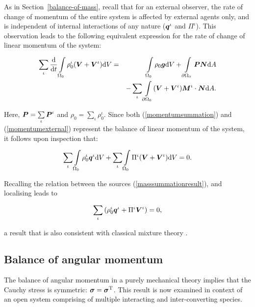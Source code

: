 As in Section~\ref{balance-of-mass}, recall that for an external
observer, the rate of change of momentum of the entire system is
affected by external agents only, and is independent of internal
interactions of any nature ($\mbox{\boldmath$ q$}^\iota$ and $\Pi^\iota$). This
observation leads to the following equivalent expression for the rate
of change of linear momentum of the system:

\begin{eqnarray}
\sum\limits_{\iota}\frac{\mathrm{d}}{\mathrm{d}t}
\int\limits_{\Omega_0} \rho_0^\iota(\mbox{\boldmath$ V$}+\mbox{\boldmath$ V$}^\iota) \mathrm{d}V &=&
\int\limits_{\Omega_0}\rho_0\mbox{\boldmath$ g$} \mathrm{d}V +
\int\limits_{\partial \Omega_0}\mbox{\boldmath$ P$}\mbox{\boldmath$ N$} \mathrm{d}A \nonumber\\
& &- \sum\limits_{\iota}\int\limits_{\partial
\Omega_0}(\mbox{\boldmath$ V$}+\mbox{\boldmath$ V$}^\iota)\mbox{\boldmath$ M$}^\iota\cdot\mbox{\boldmath$ N$} \mathrm{d}A.
\label{momentumexternal}
\end{eqnarray}

\noindent Here, $\mbox{\boldmath$ P$} = \sum\limits_{\iota}\mbox{\boldmath$ P$}^\iota$ and $\rho_0 =
\sum\limits_{\iota}\rho_0^\iota$. Since both (\ref{momentumsummation})
and (\ref{momentumexternal}) represent the balance of linear momentum
of the system, it follows upon inspection that:

\begin{eqnarray}
\sum\limits_{\iota}\int\limits_{\Omega_0} \rho^\iota_0\mbox{\boldmath$ q$}^\iota
\mathrm{d}V + \sum\limits_{\iota}\int\limits_{\Omega_0}
\Pi^\iota(\mbox{\boldmath$ V$}+\mbox{\boldmath$ V$}^\iota) \mathrm{d}V = 0.
\end{eqnarray}

Recalling the relation between the sources
(\ref{masssummationresult}), and localising leads to

\begin{eqnarray}
\sum\limits_{\iota}\left(\rho^\iota_0\mbox{\boldmath$ q$}^\iota +
\Pi^\iota\mbox{\boldmath$ V$}^\iota\right)=0,
\label{momentumsummationresult}
\end{eqnarray}

\noindent a result that is also consistent with classical mixture
theory \citep{TruesdellNoll:65}.

\subsection{Balance of angular momentum}
\label{balance-of-angular-momentum}

The balance of angular momentum in a purely mechanical theory implies
that the Cauchy stress is symmetric: $\mbox{\boldmath$\sigma$} =
\mbox{\boldmath$\sigma$}^{\mathrm{T}}$. This result is now examined in context of an
open system comprising of multiple interacting and inter-converting
species.

